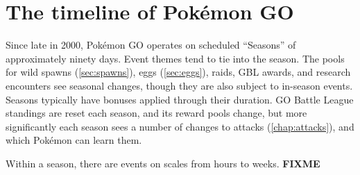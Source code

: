 \section{The timeline of Pokémon GO\label{sec:timeline}}
Since late in 2000, Pokémon GO operates on scheduled ``Seasons'' of approximately ninety days.
Event themes tend to tie into the season.
The pools for wild spawns (\autoref{sec:spawns}), eggs (\autoref{sec:eggs}), raids, GBL awards,
 and research encounters see seasonal changes, though they are also subject to in-season events.
Seasons typically have bonuses applied through their duration.
GO Battle League standings are reset each season, and its reward pools change, but
 more significantly each season sees a number of changes to attacks (\autoref{chap:attacks}),
 and which Pokémon can learn them.

Within a season, there are events on scales from hours to weeks.
\textbf{FIXME}
